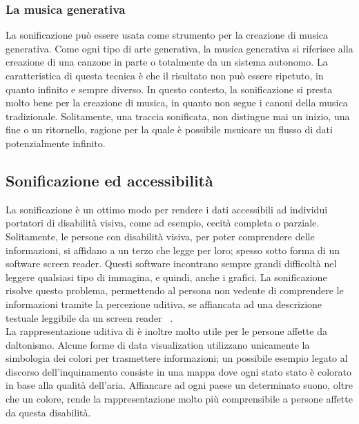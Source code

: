 \subsubsection{La musica generativa}
La sonificazione può essere usata come strumento per la creazione di musica generativa.
Come ogni tipo di arte generativa, la musica generativa si riferisce alla creazione di una canzone in parte o totalmente da un sistema autonomo.
La caratteristica di questa tecnica è che il risultato non può essere ripetuto, in quanto infinito e sempre diverso.
In questo contesto, la sonificazione si presta molto bene per la creazione di musica, in quanto non segue i canoni della musica tradizionale.
Solitamente, una traccia sonificata, non distingue mai un inizio, una fine o un ritornello, ragione per la quale è possibile msuicare un flusso di dati potenzialmente infinito.

\subsection{Sonificazione ed accessibilità}
La sonificazione è un ottimo modo per rendere i dati accessibili ad individui portatori di disabilità visiva, come ad esempio, cecità completa o parziale.
Solitamente, le persone con disabilità visiva, per poter comprendere delle informazioni, si affidano a un terzo che legge per loro; spesso sotto forma di un software screen reader.
Questi software incontrano sempre grandi difficoltà nel leggere qualsiasi tipo di immagina, e quindi, anche i grafici.
La sonificazione risolve questo problema, permettendo al persona non vedente di comprendere le informazioni tramite la percezione uditiva, se affiancata ad una descrizione testuale leggibile da un screen reader ~\cite{accessibility}.
\\
La rappresentazione uditiva di è inoltre molto utile per le persone affette da daltonismo.
Alcune forme di data visualization utilizzano unicamente la simbologia dei colori per trasmettere informazioni; un possibile esempio legato al discorso dell'inquinamento consiste in una mappa dove ogni stato stato è colorato in base alla qualità dell'aria.
Affiancare ad ogni paese un determinato suono, oltre che un colore, rende la rappresentazione molto più comprensibile a persone affette da questa disabilità.

